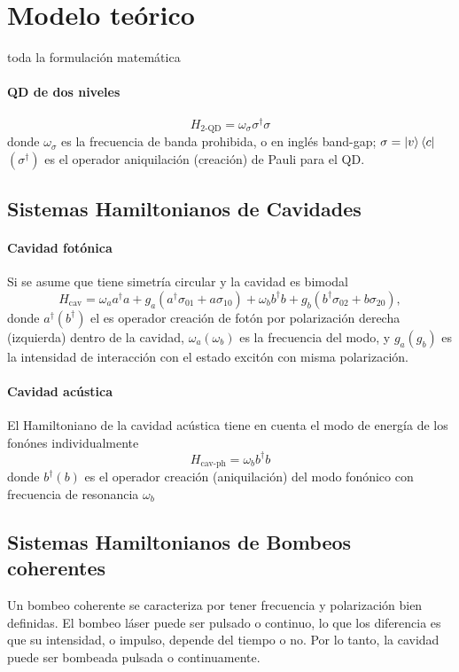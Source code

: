 \documentclass[../main.tex]{subfiles}
\begin{document}
\chapter{Modelo teórico}
toda la formulación matemática

\subsubsection{QD de dos niveles}
\begin{equation}
	H_\text{2-QD} = \omega_\sigma \sigma^\dagger \sigma
\end{equation}
donde $\omega_\sigma$ es la frecuencia de banda prohibida, o en inglés band-gap; $\sigma = \ket{v}\bra{c}$  $(\sigma^\dagger)$ es el operador aniquilación (creación) de Pauli para el QD.

\section{Sistemas Hamiltonianos de Cavidades}
\subsubsection{Cavidad fotónica}
Si se asume que tiene simetría circular y la cavidad es bimodal
\begin{equation}\label{eq:H_cav}
	H_\text{cav} = \omega_a a^\dagger a + g_a (a^\dagger \sigma_{01} + a \sigma_{10}) + \omega_b b^\dagger b + g_b (b^\dagger \sigma_{02} + b \sigma_{20}),
\end{equation}
donde $a^\dagger (b^\dagger)$ el es operador creación de fotón por polarización derecha (izquierda) dentro de la cavidad, $\omega_a (\omega_b)$ es la frecuencia del modo, y $g_a(g_b)$ es la intensidad de interacción con el estado excitón con misma polarización.

\subsubsection{Cavidad acústica}
El Hamiltoniano de la cavidad acústica tiene en cuenta el modo de energía de los fonónes individualmente
\begin{equation}\label{eq:H_cav-ph}
	H_\text{cav-ph} = \omega_b b^\dagger b
\end{equation}
donde $b^\dagger (b)$ es el operador creación (aniquilación) del modo fonónico con frecuencia de resonancia $\omega_b$

\section{Sistemas Hamiltonianos de Bombeos coherentes}
Un bombeo coherente se caracteriza por tener frecuencia y polarización bien definidas. El bombeo láser puede ser pulsado o continuo, lo que los diferencia es que su intensidad, o impulso, depende del tiempo o no. Por lo tanto, la cavidad puede ser bombeada pulsada o continuamente.
\end{document}
